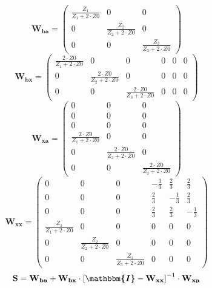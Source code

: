 \[ \mathbf{W_{ba}} = \left(\begin{array}{ccc} \frac{Z_1}{Z_1+2\cdot
Z0} & 0 & 0 \\ 0 & \frac{Z_2}{Z_2+2\cdot Z0} & 0 \\ 0 & 0 &
\frac{Z_3}{Z_3+2\cdot Z0} \end{array}\right) \]
\[ \mathbf{W_{bx}} = \left(\begin{array}{cccccc} \frac{2\cdot
Z0}{Z_1+2\cdot Z0} & 0 & 0 & 0 & 0 & 0 \\ 0 & \frac{2\cdot
Z0}{Z_2+2\cdot Z0} & 0 & 0 & 0 & 0 \\ 0 & 0 & \frac{2\cdot
Z0}{Z_3+2\cdot Z0} & 0 & 0 & 0 \end{array}\right) \]
\[ \mathbf{W_{xa}} = \left(\begin{array}{ccc} 0 & 0 & 0 \\ 0 & 0 & 0
\\ 0 & 0 & 0 \\ \frac{2\cdot Z0}{Z_1+2\cdot Z0} & 0 & 0 \\ 0 &
\frac{2\cdot Z0}{Z_2+2\cdot Z0} & 0 \\ 0 & 0 & \frac{2\cdot
Z0}{Z_3+2\cdot Z0} \end{array}\right) \]
\[ \mathbf{W_{xx}} = \left(\begin{array}{cccccc} 0 & 0 & 0 &
-\frac{1}{3} & \frac{2}{3} & \frac{2}{3} \\ 0 & 0 & 0 & \frac{2}{3} &
-\frac{1}{3} & \frac{2}{3} \\ 0 & 0 & 0 & \frac{2}{3} & \frac{2}{3} &
-\frac{1}{3} \\ \frac{Z_1}{Z_1+2\cdot Z0} & 0 & 0 & 0 & 0 & 0 \\ 0 &
\frac{Z_2}{Z_2+2\cdot Z0} & 0 & 0 & 0 & 0 \\ 0 & 0 &
\frac{Z_3}{Z_3+2\cdot Z0} & 0 & 0 & 0 \end{array}\right) \]
\[ \mathbf{S}=\mathbf{W_{ba}}+\mathbf{W_{bx}}\cdot\left[
\boldsymbol{\mathbbm{I}}
-\mathbf{W_{xx}}\right]^{-1}\cdot\mathbf{W_{xa}} \]
